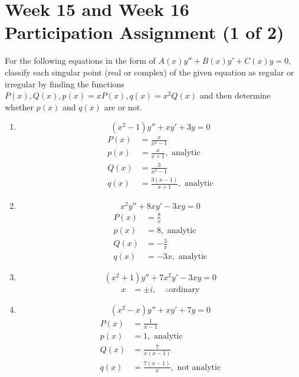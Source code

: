 \documentclass{article}
\begin{document}
\section{Week 15 and Week 16 Participation Assignment (1 of 2)}
For the following equations in the form of $ A(x)y'' + B(x)y' + C(x)y = 0 $, classify each singular point (real or complex) of the given equation as regular or irregular by finding the functions $ P(x), Q(x), p(x) = xP(x), q(x) = x^2Q(x) $ and then determine whether $ p(x) $ and $ q(x) $ are  or not.
\begin{enumerate}[label = \textbf{\arabic*)}]
	\item
		\begin{equation*}
			(x^2 - 1)y'' + xy' + 3y = 0
		\end{equation*}
		\begin{align*}
			P(x) & = \frac{ x }{ x^2 - 1 } \\
			p(x) & = \frac{ x }{ x + 1 }, \text{ analytic} \\
			Q(x) & = \frac{ 3 }{ x^2 - 1 } \\
			q(x) & = \frac{ 3(x - 1) }{ x + 1 }, \text{ analytic}
		\end{align*}
	\item
		\begin{equation*}
			x^2y'' + 8xy' - 3xy = 0
		\end{equation*}
		\begin{align*}
			P(x) & = \frac{ 8 }{ x } \\
			p(x) & = 8, \text{ analytic} \\
			Q(x) & = -\frac{ 3 }{ x } \\
			q(x) & = -3x, \text{ analytic}
		\end{align*}
	\item
		\begin{equation*}
			(x^2 + 1)y'' + 7x^2y' - 3xy = 0
		\end{equation*}
		\begin{align*}
			x & = \pm i, \quad \therefore \text{ordinary}
		\end{align*}
	\item
		\begin{equation*}
			(x^2 - x)y'' + xy' + 7y = 0
		\end{equation*}
		\begin{align*}
			P(x) & = \frac{ 1 }{ x - 1 } \\
			p(x) & = 1, \text{ analytic} \\
			Q(x) & = \frac{ 7 }{ x(x - 1) } \\
			q(x) & = \frac{ 7(x - 1) }{ x }, \text{ not analytic}
		\end{align*}
\end{enumerate}
\end{document}
